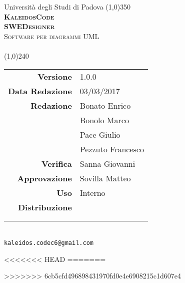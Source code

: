 \documentclass[a4paper,12pt]{article}
\author{KaleidosCode}
\date{03/03/2017}	%
\begin{document}
	\begin{titlepage}
		\centering Università degli Studi di Padova
		\line(1,0){350}\\
		\vspace{0.4cm}
		{\bfseries\scshape\LARGE KaleidosCode\\}
		\vspace{0.4cm}
		{\bfseries\scshape\LARGE SWEDesigner\\}
		{\scshape\Large Software per diagrammi UML\\}
		\vspace{1cm}
		{\scshape\Large \normediprogettoi\ \\}		%
		\vspace{1.4cm}
		\logo
		\vspace{1.2cm}
		\line(1,0){240}\\
		\begin{tabular}{r|l}
			{\hfill \textbf{Versione}} 			& 1.0.0\\
			{\hfill \textbf{Data Redazione}} 	& 03/03/2017\\	%
			{\hfill \textbf{Redazione}} 		& Bonato Enrico\\ & Bonolo Marco\\ & Pace Giulio\\ & Pezzuto Francesco\\
			{\hfill \textbf{Verifica}} 			& Sanna Giovanni\\
			{\hfill \textbf{Approvazione}} 		& Sovilla Matteo\\
			{\hfill \textbf{Uso}} 				& Interno\\
			{\hfill \textbf{Distribuzione}} 	& \vardanega \\ & \cardin \\ & \proponente\\
		\end{tabular}\\
		\vspace{2cm}
		\texttt{kaleidos.codec6@gmail.com}
	\end{titlepage}

	\pagestyle{myfront}
	\newpage
		
	\newpage
		\tableofcontents
	\pagestyle{mymain}
	\newpage
		
	\newpage
		
	\newpage
		
	\newpage
		
	\newpage
		
<<<<<<< HEAD
=======
		
>>>>>>> 6cb5cfd496898431970fd0e4e6908215c1d607e4
	\label{LastPage}
\end{document}
